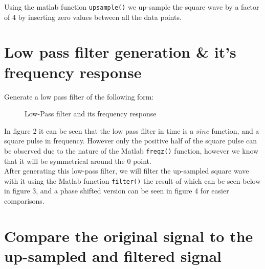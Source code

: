 \documentclass[a4paper,11pt]{article}
\newcommand{\code}[1]{	%
			{\texttt{#1}}}
\begin{document}
Using the matlab function \code{upsample()} we up-sample the square wave by a factor of 4 by inserting zero values between all the data points.

\pagebreak

\section{Low pass filter generation \& it's frequency response}
Generate a low pass filter of the following form:\\
\begin{center}
\fbox{}
\end{center}

\begin{figure}[h]
 \begin{center}
  \caption{Low-Pass filter and its frequency response}
 \end{center}
\end{figure}

In figure 2 it can be seen that the low pass filter in time is a $sinc$ function, and a square pulse in frequency. However only the positive half of the square pulse can be observed due to the nature of the Matlab \code{freqz()} function, however we know that it will be symmetrical around the 0 point.\\

After generating this low-pass filter, we will filter the up-sampled square wave with it using the Matlab function \code{filter()} the result of which can be seen below in figure 3, and a phase shifted version can be seen in figure 4 for easier comparisons. 

\pagebreak

\section{Compare the original signal to the up-sampled and filtered signal}
\end{document}
